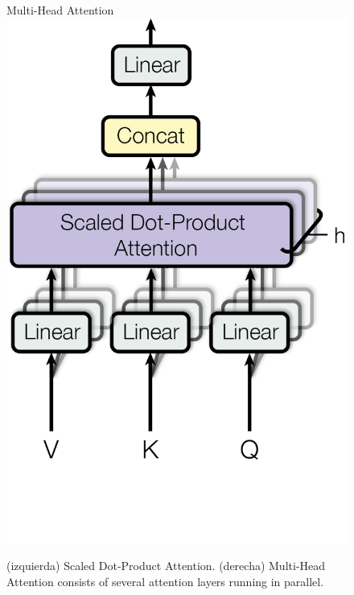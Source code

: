 \begin{figure}[H]
\begin{minipage}[f]{0.5\textwidth}
\end{minipage}
\begin{minipage}[f]{0.5\textwidth}
  \centering 
  Multi-Head Attention \\
  \vspace{0.1cm}
  \includegraphics[scale=0.6]{plantilla-libro/ModalNet-20.png}  
\end{minipage}



  \caption{(izquierda) Scaled Dot-Product Attention. (derecha) Multi-Head Attention consists of several attention layers running in parallel.}
  \label{fig:multi-head-att}
\end{figure}
\newpage
